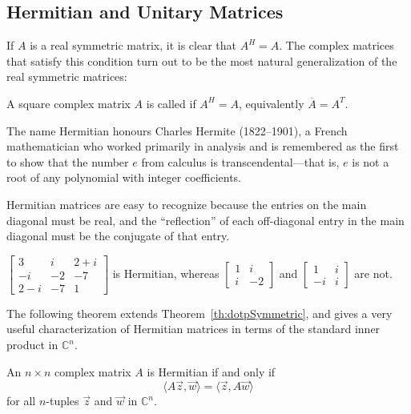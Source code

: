 \documentclass{ximera}
\begin{document}
\subsection*{Hermitian and Unitary Matrices}


If $A$ is a real symmetric matrix, it is clear that $A^{H} = A$. The complex matrices that satisfy this condition turn out to be the
most natural generalization of the real symmetric matrices:

\begin{definition}\label{def:Hermitian}
A square complex matrix $A$ is called  if $A^{H} = A$, equivalently $\overline{A} = A^T$.
\end{definition}

\begin{remark}
The name Hermitian honours Charles Hermite (1822--1901), a French
mathematician who worked primarily in analysis and is remembered as the
first to show that the number $e$ from calculus is transcendental---that is, $e$ is not a root of any polynomial with integer coefficients.
\end{remark}

Hermitian matrices are easy to
recognize because the entries on the main diagonal must be real, and the
 ``reflection'' of each off-diagonal entry in the main diagonal must be the
 conjugate of that entry.

\begin{example}\label{ex:025690}
$\left[ \begin{array}{ccc}
3 & i & 2 + i \\
-i & -2 & -7 \\
2 - i & -7 & 1
\end{array}\right]$
 is Hermitian, whereas $\left[ \begin{array}{rr}
 1 & i \\
 i & -2
 \end{array}\right]$ and $\left[ \begin{array}{rr}
 1 & i \\
 -i & i
 \end{array}\right]$ are not.
\end{example}

The following theorem extends Theorem~\ref{th:dotpSymmetric}, and gives a very useful characterization of Hermitian matrices in terms of the standard inner product in $\mathbb{C}^n$.


\begin{theorem}\label{th:025697}
An $n \times n$ complex matrix $A$ is Hermitian if and only if
\begin{equation*}
\langle A\vec{z}, \vec{w} \rangle = \langle \vec{z}, A\vec{w} \rangle
\end{equation*}
for all $n$-tuples $\vec{z}$ and $\vec{w}$ in $\mathbb{C}^n$.
\end{theorem}
\end{document}
